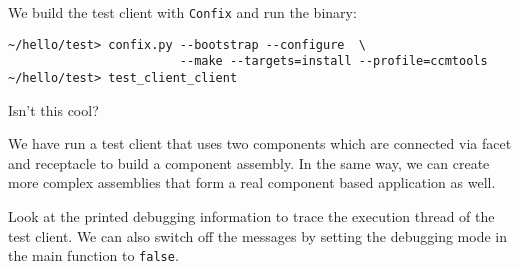 We build the test client with {\tt Confix} and run the binary:
\begin{verbatim}
~/hello/test> confix.py --bootstrap --configure  \
                        --make --targets=install --profile=ccmtools
~/hello/test> test_client_client
\end{verbatim}

Isn't this cool?

We have run a test client that uses two components which are connected via facet
and receptacle to build a component assembly. In the same way, we can create
more complex assemblies that form a real component based application as well.

Look at the printed debugging information to trace the execution thread of the
test client. We can also switch off the messages by setting the debugging mode
in the main function to {\tt false}.



